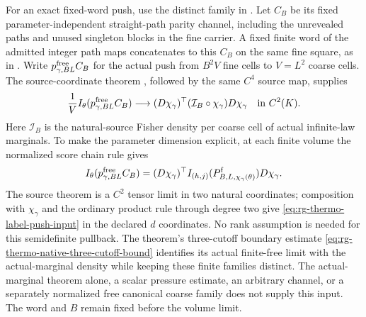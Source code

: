 For an exact fixed-word push, use the distinct family in
. Let $C_B$ be its fixed
parameter-independent straight-path parity channel, including the
unrevealed paths and unused singleton blocks in the fine carrier.
A fixed finite word of the admitted integer path maps concatenates to
this $C_B$ on the same fine square, as in
.
Write $p_{\gamma,BL}^{\rm free}C_B$ for the actual push from $B^2V$
fine cells to $V=L^2$ coarse cells. The source-coordinate theorem
, followed by the same $C^4$
source map, supplies
\begin{equation}
 \frac1V I_\theta(p_{\gamma,BL}^{\rm free}C_B)
 \longrightarrow (D\chi_\gamma)^\top
      (\mathcal I_B\circ\chi_\gamma)D\chi_\gamma
 \quad\hbox{in }C^2(K).
 \label{eq:rg-thermo-label-push-input}
\end{equation}
Here $\mathcal I_B$ is the natural-source Fisher density per coarse cell
of actual infinite-law marginals. To make the parameter dimension
explicit, at each finite volume the normalized score chain rule gives
\begin{equation}
 I_\theta(p_{\gamma,BL}^{\rm free}C_B)
 =(D\chi_\gamma)^\top
 I_{(h,j)}(P^{\rm f}_{B,L,\chi_\gamma(\theta)})D\chi_\gamma.
 \label{eq:rg-thermo-label-push-pullback}
\end{equation}
The source theorem is a $C^2$ tensor limit in two natural coordinates;
composition with $\chi_\gamma$ and the ordinary product rule through
degree two give \cref{eq:rg-thermo-label-push-input} in the declared
$d$ coordinates. No rank assumption is needed for this semidefinite
pullback. The theorem's three-cutoff boundary estimate
\cref{eq:rg-thermo-native-three-cutoff-bound} identifies its actual
finite-free limit with the actual-marginal density while keeping these
finite families distinct. The actual-marginal theorem alone, a scalar
pressure estimate, an arbitrary channel, or a separately normalized
free canonical coarse family does not supply this input. The word and
$B$ remain fixed before the volume limit.\thermoestablishedstatus

